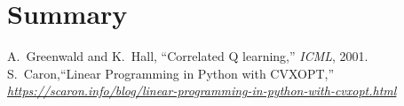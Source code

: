 \documentclass[conference]{IEEEtran}
\begin{document}
\section*{Summary}
\begin{thebibliography}{1}
A.~Greenwald and K.~Hall, ``Correlated Q learning,'' {\em ICML}, 2001.
S.~Caron,``Linear Programming in Python with CVXOPT,'' {\em \url {https://scaron.info/blog/linear-programming-in-python-with-cvxopt.html}}
\end{thebibliography}
\end{document}
